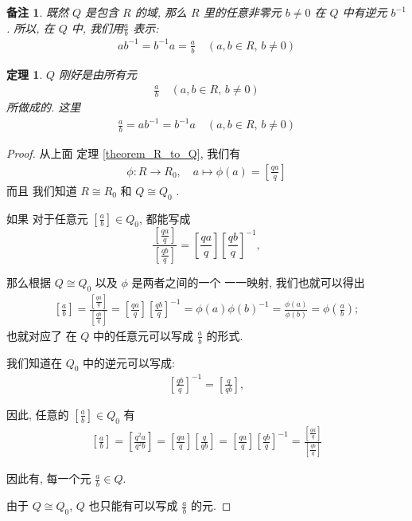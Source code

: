 \documentclass[utf8]{ctexbook}
\newtheorem{theorem}{定理}[section]
\newtheorem{memo}{备注}[section]
\begin{document}
\begin{memo}
既然 $Q$ 是包含 $R$ 的域, 那么 $R$ 里的任意非零元 $b \neq 0$ 在 $Q$ 中有逆元 $b^{-1}$. 所以, 在 $Q$ 中, 我们用$\frac{a}{b}$ 表示:
\begin{align*}
a b^{-1} = b^{-1} a = \frac{a}{b} \quad (a, b \in R, \, b \neq 0)
\end{align*}

\end{memo}

\begin{theorem}\label{theorem_fraction_field_structure}
$Q$ 刚好是由所有元
\begin{align*}
\frac{a}{b} \quad (a, b \in R,\, b \neq 0)
\end{align*}
所做成的. 这里
\begin{align*}
\frac{a}{b}  = a b^{-1} = b^{-1} a  \quad (a, b \in R, \, b \neq 0)
\end{align*}

\end{theorem}

\begin{proof}
从上面 定理 \ref{theorem_R_to_Q}, 我们有 
\begin{align*}
\phi: R \longrightarrow R_0, \quad a \mapsto \phi(a) = \left[ \frac{q a}{q} \right]
\end{align*}
而且 我们知道 $R \cong R_0 $ 和 $Q \cong Q_0$ .

如果 对于任意元 $  \left[ \frac{a }{ b} \right]  \in Q_0$, 都能写成
$$ \frac{\left[ \frac{q a}{q} \right]}{\left[ \frac{q b}{q} \right]} = \left[ \frac{q a}{q} \right] \left[ \frac{q b}{q} \right]^{-1} ,$$

那么根据 $Q \cong Q_0$ 以及 $\phi$ 是两者之间的一个 一一映射, 我们也就可以得出
\begin{align*}
\left[ \frac{a }{ b} \right] =  \frac{\left[ \frac{q a}{q} \right]}{\left[ \frac{q b}{q} \right]} =  \left[ \frac{q a}{q} \right] \left[ \frac{q b}{q} \right]^{-1} = \phi(a) \phi(b)^{-1} = \frac{\phi(a)}{\phi(b)} = \phi(\frac{a}{b}) ;
\end{align*}
也就对应了 在 $Q$ 中的任意元可以写成 $ \frac{a}{b} $ 的形式.

我们知道在 $Q_0$ 中的逆元可以写成:
\begin{align*}
 \left[ \frac{q b}{q} \right] ^{-1} =  \left[ \frac{q }{q b} \right] ,
\end{align*}

因此, 任意的 $\left[ \frac{a }{ b} \right] \in Q_0 $ 有
\begin{align*}
\left[ \frac{a }{ b} \right] =  \left[ \frac{q^2 a }{q^2 b} \right]  = \left[ \frac{q a}{q} \right] \left[ \frac{q }{q b} \right] = \left[ \frac{q a}{q} \right] \left[ \frac{q b}{q} \right]^{-1} = \frac{\left[ \frac{q a}{q} \right]}{\left[ \frac{q b}{q} \right]} 
\end{align*}

因此有, 每一个元 $\frac{a}{b} \in Q$. 

由于 $Q \cong Q_0$, $Q$ 也只能有可以写成 $\frac{a}{b}$ 的元.

\end{proof}
\end{document}
